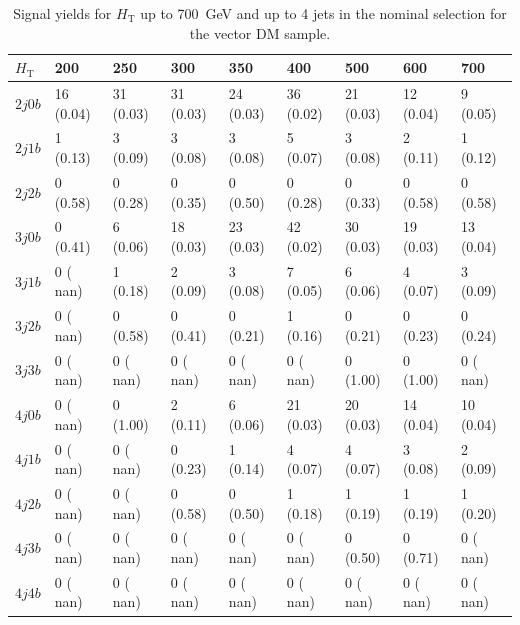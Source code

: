 \begin{table}[h]
\small
\begin{tabular}{lllllllll}
\hline \hline
$H_\textrm{T}$                 &     200 &            250 &             300&             350&             400&             500&             600&             700  \\\hline\hline
$2j 0b$&          16 (0.04)&	   31 (0.03)&	   31 (0.03)&	   24 (0.03)&	   36 (0.02)&	   21 (0.03)&	   12 (0.04)&	    9 (0.05) \\\hline
$2j 1b$&           1 (0.13)&	    3 (0.09)&	    3 (0.08)&	    3 (0.08)&	    5 (0.07)&	    3 (0.08)&	    2 (0.11)&	    1 (0.12) \\\hline
$2j 2b$&           0 (0.58)&	    0 (0.28)&	    0 (0.35)&	    0 (0.50)&	    0 (0.28)&	    0 (0.33)&	    0 (0.58)&	    0 (0.58) \\\hline
$3j 0b$&           0 (0.41)&	    6 (0.06)&	   18 (0.03)&	   23 (0.03)&	   42 (0.02)&	   30 (0.03)&	   19 (0.03)&	   13 (0.04) \\\hline
$3j 1b$&           0 ( nan)&	    1 (0.18)&	    2 (0.09)&	    3 (0.08)&	    7 (0.05)&	    6 (0.06)&	    4 (0.07)&	    3 (0.09) \\\hline
$3j 2b$&           0 ( nan)&	    0 (0.58)&	    0 (0.41)&	    0 (0.21)&	    1 (0.16)&	    0 (0.21)&	    0 (0.23)&	    0 (0.24) \\\hline
$3j 3b$&           0 ( nan)&	    0 ( nan)&	    0 ( nan)&	    0 ( nan)&	    0 ( nan)&	    0 (1.00)&	    0 (1.00)&	    0 ( nan) \\\hline
$4j 0b$&           0 ( nan)&	    0 (1.00)&	    2 (0.11)&	    6 (0.06)&	   21 (0.03)&	   20 (0.03)&	   14 (0.04)&	   10 (0.04) \\\hline
$4j 1b$&           0 ( nan)&	    0 ( nan)&	    0 (0.23)&	    1 (0.14)&	    4 (0.07)&	    4 (0.07)&	    3 (0.08)&	    2 (0.09) \\\hline
$4j 2b$&           0 ( nan)&	    0 ( nan)&	    0 (0.58)&	    0 (0.50)&	    1 (0.18)&	    1 (0.19)&	    1 (0.19)&	    1 (0.20) \\\hline
$4j 3b$&           0 ( nan)&	    0 ( nan)&	    0 ( nan)&	    0 ( nan)&	    0 ( nan)&	    0 (0.50)&	    0 (0.71)&	    0 ( nan) \\\hline
$4j 4b$&           0 ( nan)&	    0 ( nan)&	    0 ( nan)&	    0 ( nan)&	    0 ( nan)&	    0 ( nan)&	    0 ( nan)&	    0 ( nan) \\\hline
\hline
\end{tabular}
\caption{Signal yields for $H_\textrm{T}$ up to 700~GeV and up to 4 jets in the nominal selection for the vector DM sample.}
\label{tab:sig_yields_VDM_nom}
\end{table}

